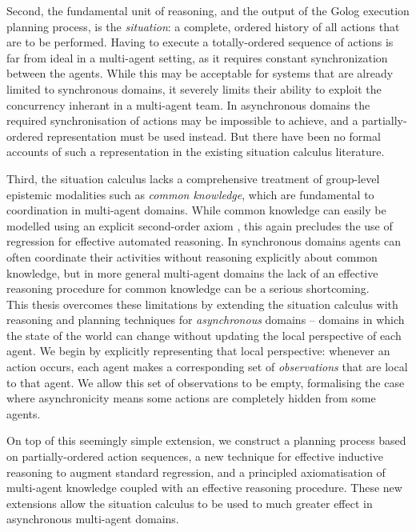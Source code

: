 Second, the fundamental unit of reasoning, and the output of the Golog
execution planning process, is the \emph{situation}: a complete, ordered
history of all actions that are to be performed. Having to execute
a totally-ordered sequence of actions is far from ideal in a multi-agent
setting, as it requires constant synchronization between the agents.
While this may be acceptable for systems that are already limited
to synchronous domains, it severely limits their ability to exploit
the concurrency inherant in a multi-agent team. In asynchronous domains
the required synchronisation of actions may be impossible to achieve,
and a partially-ordered representation must be used instead. But there
have been no formal accounts of such a representation in the existing
situation calculus literature.

Third, the situation calculus lacks a comprehensive treatment of group-level
epistemic modalities such as \emph{common knowledge}, which are fundamental
to coordination in multi-agent domains. While common knowledge can
easily be modelled using an explicit second-order axiom \citep{delgrande01sitcalc_cleudo,davis05fo_ma_theory,ghaderi07sc_joint_ability},
this again precludes the use of regression for effective automated
reasoning. In synchronous domains agents can often coordinate their
activities without reasoning explicitly about common knowledge, but
in more general multi-agent domains the lack of an effective reasoning
procedure for common knowledge can be a serious shortcoming.\\


This thesis overcomes these limitations by extending the situation
calculus with reasoning and planning techniques for \emph{asynchronous}
domains -- domains in which the state of the world can change without
updating the local perspective of each agent. We begin by explicitly
representing that local perspective: whenever an action occurs, each
agent makes a corresponding set of \emph{observations} that are local
to that agent. We allow this set of observations to be empty, formalising
the case where asynchronicity means some actions are completely hidden
from some agents.

On top of this seemingly simple extension, we construct a planning
process based on partially-ordered action sequences, a new technique
for effective inductive reasoning to augment standard regression,
and a principled axiomatisation of multi-agent knowledge coupled with
an effective reasoning procedure. These new extensions allow the situation
calculus to be used to much greater effect in asynchronous multi-agent
domains.\newpage{}


